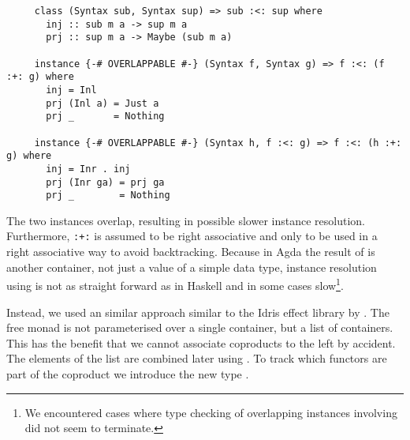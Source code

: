 \begin{verbatim}
     class (Syntax sub, Syntax sup) => sub :<: sup where
       inj :: sub m a -> sup m a
       prj :: sup m a -> Maybe (sub m a)

     instance {-# OVERLAPPABLE #-} (Syntax f, Syntax g) => f :<: (f :+: g) where
       inj = Inl
       prj (Inl a) = Just a
       prj _       = Nothing

     instance {-# OVERLAPPABLE #-} (Syntax h, f :<: g) => f :<: (h :+: g) where
       inj = Inr . inj
       prj (Inr ga) = prj ga
       prj _        = Nothing
\end{verbatim}
The two instances overlap, resulting in possible slower instance resolution.
Furthermore, \texttt{:+:} is assumed to be right associative and only to be
used in a right associative way to avoid backtracking.
Because in Agda the result of  is another container, not
just a value of a simple data type, instance resolution using
 is not as straight forward as in Haskell and in some cases
slow\footnote{We encountered cases where type checking of overlapping instances
  involving  did not seem to terminate.}.

Instead, we used an similar approach similar to the Idris effect library
by \textcite{DBLP:conf/icfp/Brady13}.
The free monad is not parameterised over a single container, but a list
 of containers.
This has the benefit that we cannot associate coproducts to the left by
accident.
The elements of the list are combined later using .
To track which functors are part of the coproduct we introduce the new type
.

